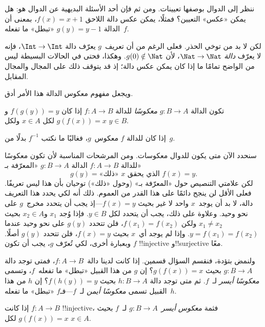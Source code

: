 \documentclass[../../../include/open-logic-section]{subfiles}
\begin{document}

\begin{explain}
ننظر إلى الدوال بوصفها تعيينات. ومن ثم فإن أحد الأسئلة البديهية عن
الدوال هو: هل يمكن «عكس» التعيين؟ فمثلًا، يمكن عكس دالة اللاحق
$f(x) = x + 1$، بمعنى أن الدالة $g(y) = y - 1$ «تبطل» ما تفعله~$f$.

لكن لا بد من توخي الحذر. فعلى الرغم من أن تعريف~$g$ يعرّف
دالة $\Int \to \Int$، فإنه لا يعرّف \emph{دالة} $\Nat
\to \Nat$، لأن $g(0) \notin \Nat$. وهكذا، فحتى في الحالات البسيطة
ليس من الواضح تمامًا ما إذا كان يمكن عكس دالة؛ إذ قد يتوقف ذلك على
المجال والمجال المقابل.

ويجعل مفهوم معكوس الدالة هذا الأمر أدق.
\end{explain}

\begin{defn}
تكون الدالة $g \colon B \to A$ \emph{معكوسًا} للدالة $f
\colon A \to B$ إذا كان $f(g(y)) = y$ و$g(f(x)) = x$ لكل $x \in A$
ولكل $y \in B$.
\end{defn}

إذا كان للدالة $f$ معكوس~$g$، فغالبًا ما نكتب $f^{-1}$ بدلًا من~$g$.

\begin{explain}
سنحدد الآن متى يكون للدوال معكوسات. ومن المرشحات المناسبة لأن تكون
معكوسًا للدالة $f\colon A \to B$ الدالة $g\colon B \to A$ «المعرّفة
بـ»
\[
g(y) = \text{«ذلك» $x$ الذي يحقق $f(x) = y$.}
\]
لكن علامتي التنصيص حول «المعرّفة بـ» (وحول «ذلك») توحيان بأن
هذا ليس تعريفًا. فعلى الأقل لن ينجح دائمًا على هذا القدر من العموم.
ذلك أنه لكي يحدد هذا التعريف دالة، لا بد أن يوجد~$x$ واحد لا غير
بحيث $f(x) =
y$---إذ يجب أن يتحدد مخرج~$g$ على نحو وحيد. وعلاوة على ذلك، يجب
أن يتحدد لكل $y \in B$. فإذا وُجد $x_1$ و$x_2 \in
A$ بحيث $x_1 \neq x_2$ ولكن $f(x_1) = f(x_2)$، فلن تتحدد $g(y)$
على نحو وحيد عندما $y = f(x_1) = f(x_2)$. وإذا لم يوجد أي~$x$
بحيث $f(x) = y$، فلن تتحدد $g(y)$ أصلًا. وبعبارة أخرى، لكي
تُعرّف $g$، يجب أن تكون $f$ !!{injective} و!!{surjective} معًا.

ولنمض بتؤدة، فنقسم السؤال قسمين. إذا كانت لدينا
دالة~$f\colon A \to B$، فمتى توجد دالة $g\colon B \to A$
بحيث $g(f(x)) = x$؟ إن $g$ من هذا القبيل «تبطل» ما تفعله~$f$، وتسمى
\emph{معكوسًا أيسر} لـ~$f$. ثم متى توجد
دالة $h\colon B \to A$ بحيث $f(h(y)) = y$؟ إن $h$ من هذا القبيل
تسمى \emph{معكوسًا أيمن} لـ~$f$---فـ$f$ «تبطل» ما تفعله~$h$.
\end{explain}

\begin{prop}
إذا كانت $f\colon A \to B$ !!{injective}، فثمة \emph{معكوس
أيسر}~$g\colon B \to A$ لـ~$f$ بحيث $g(f(x)) = x$ لكل $x
\in A$.
\end{prop}
\end{document}
